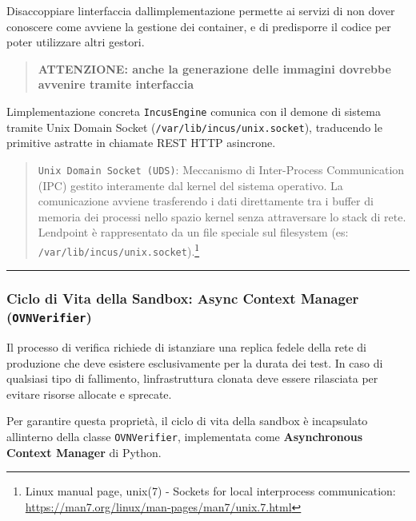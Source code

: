 Disaccoppiare l\textquotesingle interfaccia
dall\textquotesingle implementazione permette ai servizi di non dover
conoscere come avviene la gestione dei container, e di predisporre il
codice per poter utilizzare altri gestori.

\begin{quote}
\textbf{ATTENZIONE: anche la generazione delle immagini dovrebbe
avvenire tramite interfaccia}
\end{quote}

L\textquotesingle implementazione concreta
\passthrough{\lstinline!IncusEngine!} comunica con il demone di sistema
tramite Unix Domain Socket
(\passthrough{\lstinline!/var/lib/incus/unix.socket!}), traducendo le
primitive astratte in chiamate REST HTTP asincrone.

\begin{quote}
\passthrough{\lstinline!Unix Domain Socket (UDS)!}: Meccanismo di
Inter-Process Communication (IPC) gestito interamente dal kernel del
sistema operativo. La comunicazione avviene trasferendo i dati
direttamente tra i buffer di memoria dei processi nello spazio kernel
senza attraversare lo stack di rete. L\textquotesingle endpoint è
rappresentato da un file speciale sul filesystem (es:
\passthrough{\lstinline!/var/lib/incus/unix.socket!}).\footnote{\label{fn:ref_21}Linux
  manual page, unix(7) - Sockets for local interprocess communication:
  \url{https://man7.org/linux/man-pages/man7/unix.7.html}}
\end{quote}

\begin{center}\rule{0.5\linewidth}{0.5pt}\end{center}

\subsubsection{\texorpdfstring{Ciclo di Vita della Sandbox: Async
Context Manager
(\texttt{OVNVerifier})}{Ciclo di Vita della Sandbox: Async Context Manager (OVNVerifier)}}\label{ciclo-di-vita-della-sandbox-async-context-manager-ovnverifier}

Il processo di verifica richiede di istanziare una replica fedele della
rete di produzione che deve esistere esclusivamente per la durata dei
test. In caso di qualsiasi tipo di fallimento,
l\textquotesingle infrastruttura clonata deve essere rilasciata per
evitare risorse allocate e sprecate.

Per garantire questa proprietà, il ciclo di vita della sandbox è
incapsulato all\textquotesingle interno della classe
\passthrough{\lstinline!OVNVerifier!}, implementata come
\textbf{Asynchronous Context Manager} di Python.

